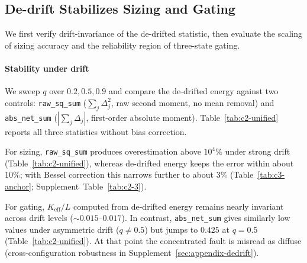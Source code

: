 \subsection{De-drift Stabilizes Sizing and Gating}
\label{sec:eval-dedrift}

We first verify drift-invariance of the de-drifted statistic, then evaluate the scaling of sizing accuracy and the reliability region of three-state gating.

\paragraph{Stability under drift}
We sweep $q$ over ${0.2, 0.5, 0.9}$ and compare the
de-drifted energy against two controls: \texttt{raw\_sq\_sum}
($\sum_j \Delta_j^2$, raw second moment, no mean removal) and
\texttt{abs\_net\_sum} ($|\sum_j \Delta_j|$, first-order absolute moment).
Table~\ref{tab:c2-unified} reports all three statistics without bias correction.

For sizing, \texttt{raw\_sq\_sum} produces overestimation above
$10^4\%$ under strong drift (Table~\ref{tab:c2-unified}),
whereas de-drifted energy keeps the error within about 10\%;
with Bessel correction this narrows further to about 3\%
(Table~\ref{tab:c3-anchor}; Supplement~Table~\ref{tab:c2-3}).

For gating, $K_{\mathrm{eff}}/L$ computed from de-drifted energy
remains nearly invariant across drift levels
(${\sim}0.015$--$0.017$). In contrast, \texttt{abs\_net\_sum} gives similarly low values under
asymmetric drift ($q \neq 0.5$) but jumps to $0.425$ at $q{=}0.5$
(Table~\ref{tab:c2-unified}). At that point the concentrated
fault is misread as diffuse (cross-configuration robustness
in Supplement~\ref{sec:appendix-dedrift}).

